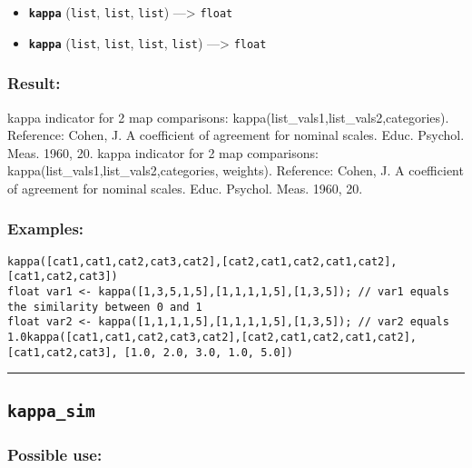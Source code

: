 \documentclass[]{book}
\providecommand{\tightlist}{%
  \setlength{\itemsep}{0pt}\setlength{\parskip}{0pt}}
\theoremstyle{definition}
\theoremstyle{definition}
\theoremstyle{definition}
\theoremstyle{remark}
\begin{document}
\begin{itemize}
\tightlist
\item
  \textbf{\texttt{kappa}} (\texttt{list}, \texttt{list}, \texttt{list})
  ---\textgreater{} \texttt{float}
\item
  \textbf{\texttt{kappa}} (\texttt{list}, \texttt{list}, \texttt{list},
  \texttt{list}) ---\textgreater{} \texttt{float}
\end{itemize}

\subsubsection{Result:}\label{result-301}

kappa indicator for 2 map comparisons:
kappa(list\_vals1,list\_vals2,categories). Reference: Cohen, J. A
coefficient of agreement for nominal scales. Educ. Psychol. Meas. 1960,
20. kappa indicator for 2 map comparisons:
kappa(list\_vals1,list\_vals2,categories, weights). Reference: Cohen, J.
A coefficient of agreement for nominal scales. Educ. Psychol. Meas.
1960, 20.

\subsubsection{Examples:}\label{examples-218}

\begin{verbatim}
kappa([cat1,cat1,cat2,cat3,cat2],[cat2,cat1,cat2,cat1,cat2],[cat1,cat2,cat3])  
float var1 <- kappa([1,3,5,1,5],[1,1,1,1,5],[1,3,5]); // var1 equals the similarity between 0 and 1 
float var2 <- kappa([1,1,1,1,5],[1,1,1,1,5],[1,3,5]); // var2 equals 1.0kappa([cat1,cat1,cat2,cat3,cat2],[cat2,cat1,cat2,cat1,cat2],[cat1,cat2,cat3], [1.0, 2.0, 3.0, 1.0, 5.0]) 
\end{verbatim}

\begin{center}\rule{0.5\linewidth}{\linethickness}\end{center}

\subsection{\texorpdfstring{\texttt{kappa\_sim}}{kappa\_sim}}\label{kappa_sim}

\subsubsection{Possible use:}\label{possible-use-312}
\end{document}
